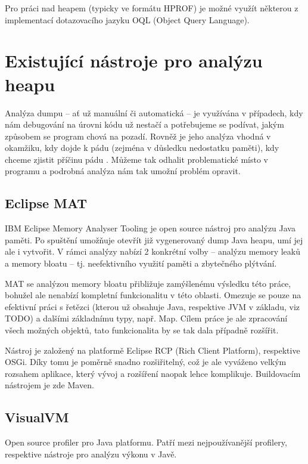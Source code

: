 Pro práci nad heapem  (typicky ve formátu HPROF) je možné využít některou z implementací dotazovacího jazyku OQL (Object Query Language).






\chapter{Existující nástroje pro analýzu heapu}

Analýza dumpu -- ať už manuální či automatická -- je využívána v případech, kdy nám debugování na úrovni kódu už nestačí a potřebujeme se podívat, jakým způsobem se program chová na pozadí. Rovněž je jeho analýza vhodná v okamžiku, kdy dojde k pádu (zejména v důsledku nedostatku paměti), kdy chceme zjistit příčinu pádu . Můžeme tak odhalit problematické místo v programu a podrobná analýza nám tak umožní problém opravit.

\section{Eclipse MAT}
IBM Eclipse Memory Analyser Tooling je open source nástroj pro analýzu Java paměti. Po spuštění umožňuje otevřít již vygenerovaný dump Java heapu, umí jej ale i vytvořit. V rámci analýzy nabízí 2 konkrétní volby – analýzu memory leaků a memory bloatu – tj. neefektivního využití paměti a zbytečného plýtvání. 

MAT se analýzou memory bloatu přibližuje zamýšlenému výsledku této práce, bohužel ale nenabízí kompletní funkcionalitu v této oblasti. Omezuje se pouze na efektivní práci s řetězci (kterou už obsahuje Java, respektive JVM v základu, viz TODO) a dalšími základnímu typy, např. Map. Cílem práce je ale zpracování všech možných objektů, tato funkcionalita by se tak dala případně rozšířit.

Nástroj je založený na platformě Eclipse RCP (Rich Client Platform), respektive OSGi. Díky tomu je poměrně snadno rozšiřitelný, což je ale vyváženo velkým rozsahem aplikace, který vývoj a rozšíření naopak lehce komplikuje. Buildovacím nástrojem je zde Maven.

\section{VisualVM}
Open source profiler pro Java platformu. Patří mezi nejpoužívanější profilery, respektive nástroje pro analýzu výkonu v Javě.

